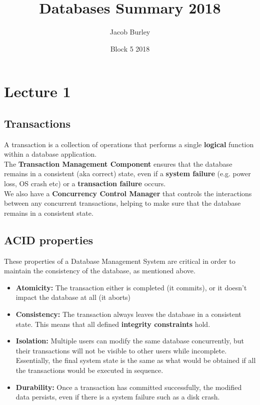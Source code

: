 \documentclass{article}
\title{Databases Summary 2018}
\author{Jacob Burley}
\date{Block 5 2018}
\begin{document}
\long{}
\maketitle

\section*{Lecture 1}
\subsection*{Transactions}
A transaction is a collection of operations that performs a single \textbf{logical} function within a database application.
\\The \textbf{Transaction Management Component} ensures that the database remains in a consistent (aka correct) state, even if a \textbf{system failure} (e.g. power loss, OS crash etc) or a \textbf{transaction failure} occurs.
\\We also have a \textbf{Concurrency Control Manager} that controls the interactions between any concurrent transactions, helping to make sure that the database remains in a consistent state.

\subsection*{ACID properties}
These properties of a Database Management System are critical in order to maintain the consistency of the database, as mentioned above.
\begin{itemize}
    \item \textbf{Atomicity:} The transaction either is completed (it commits), or it doesn't impact the database at all (it aborts)
    \item \textbf{Consistency:} The transaction always leaves the database in a consistent state. This means that all defined \textbf{integrity constraints} hold.
    \item \textbf{Isolation:} Multiple users can modify the same database concurrently, but their transactions will not be visible to other users while incomplete. Essentially, the final system state is the same as what would be obtained if all the transactions would be executed in sequence.
    \item \textbf{Durability:} Once a transaction has committed successfully, the modified data persists, even if there is a system failure such as a disk crash.
\end{itemize}
\newpage    
\end{document}
